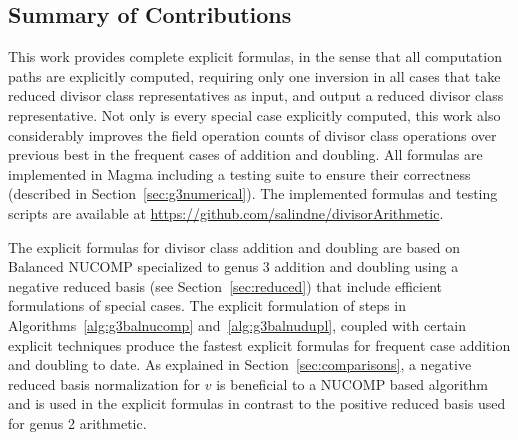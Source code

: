 \subsection{Summary of Contributions}
This work provides complete explicit formulas, in the sense that all computation
paths are explicitly computed, requiring only one inversion in all cases that
take reduced divisor class representatives as input, and output a reduced
divisor class representative. Not only is every special case explicitly
computed, this work also considerably improves the field operation counts of
divisor class operations over previous best in the frequent cases of addition
and doubling. 
All formulas are implemented in Magma including a
testing suite to ensure their correctness (described in
Section~\ref{sec:g3numerical}). The implemented formulas and testing scripts are
available at \url{https://github.com/salindne/divisorArithmetic}.

The explicit formulas for divisor class addition and doubling are based on Balanced
NUCOMP specialized to genus 3 addition and doubling using a negative reduced
basis (see Section~\ref{sec:reduced}) that include efficient formulations of
special cases. The explicit formulation of steps in Algorithms~\ref{alg:g3balnucomp}
and~\ref{alg:g3balnudupl}, coupled with certain explicit techniques produce the
fastest explicit formulas for frequent case addition and doubling to date. As
explained in Section~\ref{sec:comparisons}, a negative reduced basis
normalization for $v$ is beneficial to a NUCOMP based algorithm and is used in the
explicit formulas in contrast to the positive reduced basis used for genus 2
arithmetic.

